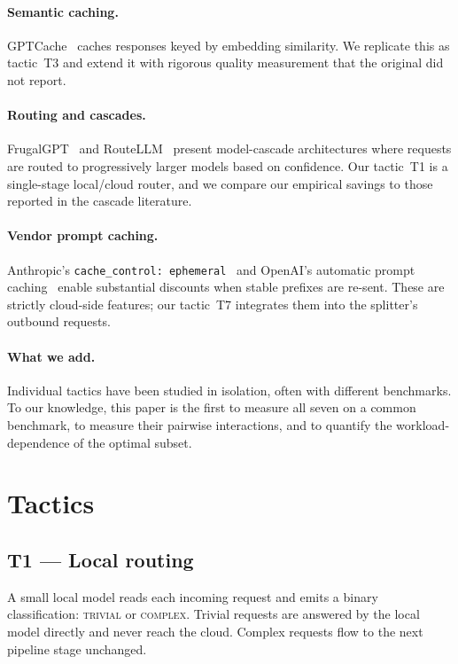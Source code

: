 \documentclass[11pt,a4paper]{article}
\begin{document}
\paragraph{Semantic caching.}
GPTCache~\cite{gptcache} caches responses keyed by embedding
similarity. We replicate this as tactic~T3 and extend it with
rigorous quality measurement that the original did not report.

\paragraph{Routing and cascades.}
FrugalGPT~\cite{frugalgpt} and RouteLLM~\cite{routellm}
present model-cascade architectures where requests are routed to
progressively larger models based on confidence. Our tactic~T1 is a
single-stage local/cloud router, and we compare our empirical savings
to those reported in the cascade literature.

\paragraph{Vendor prompt caching.}
Anthropic's \texttt{cache\_control: ephemeral}~\cite{anthropic-cache}
and OpenAI's automatic prompt caching~\cite{openai-cache} enable
substantial discounts when stable prefixes are re-sent. These are
strictly cloud-side features; our tactic~T7 integrates them into
the splitter's outbound requests.

\paragraph{What we add.}
Individual tactics have been studied in isolation, often with
different benchmarks. To our knowledge, this paper is the first to
measure all seven on a common benchmark, to measure their pairwise
interactions, and to quantify the workload-dependence of the optimal
subset.

\section{Tactics}
\label{sec:tactics}

\subsection{T1 --- Local routing}
\label{sec:t1}

A small local model reads each incoming request and emits a binary
classification: \textsc{trivial} or \textsc{complex}. Trivial requests
are answered by the local model directly and never reach the cloud.
Complex requests flow to the next pipeline stage unchanged.
\end{document}
